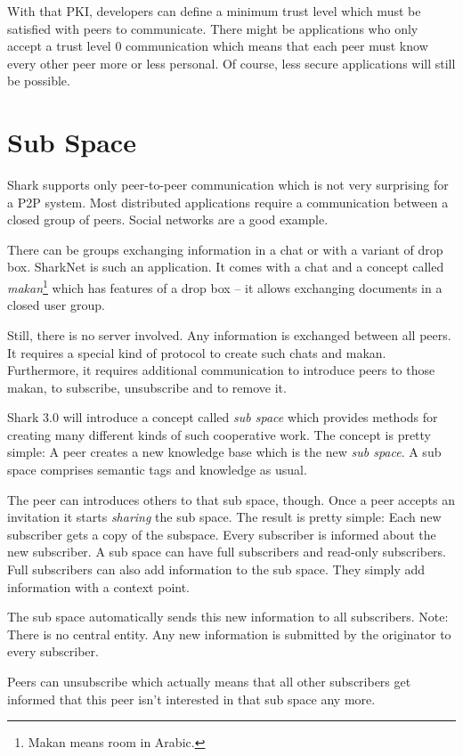 With that PKI, developers can define a minimum trust level which must be satisfied with peers to communicate. There might be applications who only accept a trust level 0 communication which means that each peer must know every other peer more or less personal. Of course, less secure applications will still be possible.

\section{Sub Space}
Shark supports only peer-to-peer communication which is not very surprising for a P2P system. Most distributed applications require a communication between a closed group of peers. Social networks are a good example.

There can be groups exchanging information in a chat or with a variant of drop box. SharkNet is such an application. It comes with a chat and a concept called {\it makan}\footnote{Makan means room in Arabic.} which has features of a drop box -- it allows exchanging documents in a closed user group.

Still, there is no server involved. Any information is exchanged between all peers. It requires a special kind of protocol to create such chats and makan. Furthermore, it requires additional communication to introduce peers to those makan, to subscribe, unsubscribe and to remove it.

Shark 3.0 will introduce a concept called {\it sub space} which provides methods for creating many different kinds of such cooperative work. The concept is pretty simple: A peer creates a new knowledge base which is the new {\it sub space}. 
A sub space comprises semantic tags and knowledge as usual.

The peer can introduces others to that sub space, though. Once a peer accepts an invitation it starts {\it sharing} the sub space. The result is pretty simple: Each new subscriber gets a copy of the subspace. Every subscriber is informed about the new subscriber. A sub space can have full subscribers and read-only subscribers. Full subscribers can also add information to the sub space. They simply add information with a context point.

The sub space automatically sends this new information to all subscribers. Note: There is no central entity. Any new information is submitted by the originator to every subscriber. 

Peers can unsubscribe which actually means that all other subscribers get informed that this peer isn't interested in that sub space any more.

